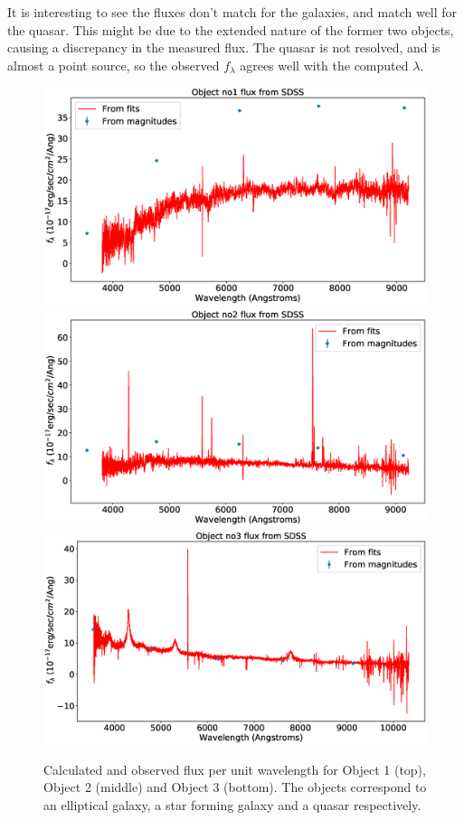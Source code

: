 \documentclass{article}
\begin{document}
It is interesting to see the fluxes don't match for the galaxies, and match well for the quasar. This might be due to the extended nature of the former two objects, causing a discrepancy in the measured flux. The quasar is not resolved, and is almost a point source, so the observed $f_\lambda$ agrees well with the computed $\lambda$.
\begin{figure}[!htpb]
\centering
\includegraphics[width=0.8\linewidth]{Object_1.eps}
\includegraphics[width=0.8\linewidth]{Object_2.eps}
\includegraphics[width=0.8\linewidth]{Object_3.eps}
\caption{Calculated and observed flux per unit wavelength for Object 1 (top), Object 2 (middle) and Object 3 (bottom). The objects correspond to an elliptical galaxy, a star forming galaxy and a quasar respectively.}
\label{fig:sdss}
\end{figure}
\end{document}
